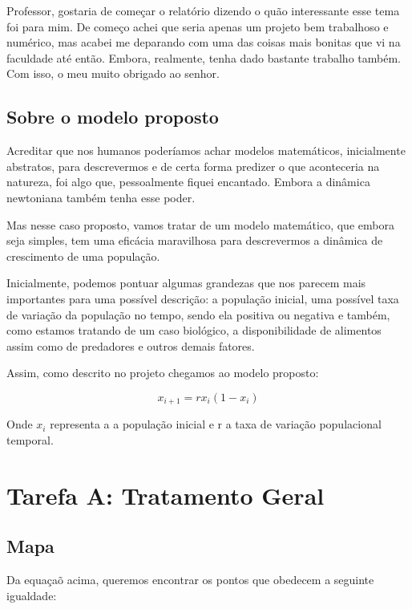 \documentclass[a4paper, 12pt]{article}
\begin{document}
Professor, gostaria de começar o relatório dizendo o quão interessante esse tema foi para mim. De começo achei que seria apenas um projeto bem trabalhoso e numérico, mas acabei me deparando com uma das coisas mais bonitas que vi na faculdade até então. Embora, realmente, tenha dado bastante trabalho também. Com isso, o meu muito obrigado ao senhor.

\subsection{Sobre o modelo proposto}

Acreditar que nos humanos poderíamos achar modelos matemáticos, inicialmente abstratos, para descrevermos e de certa forma predizer o que aconteceria na natureza, foi algo que, pessoalmente fiquei encantado. Embora a dinâmica newtoniana também tenha esse poder.

Mas nesse caso proposto, vamos tratar de um modelo matemático, que embora seja simples, tem uma eficácia maravilhosa para descrevermos a dinâmica de crescimento de uma população.

Inicialmente, podemos pontuar algumas grandezas que nos parecem mais importantes para uma possível descrição: a população inicial, uma possível taxa de variação da população no tempo, sendo ela positiva ou negativa e também, como estamos tratando de um caso biológico, a disponibilidade de alimentos assim como de predadores e outros demais fatores.

\hfill

Assim, como descrito no projeto chegamos ao modelo proposto:

\begin{equation}
    x_{i+1} = rx_{i}(1-x_{i})
\end{equation}

Onde $x_{i}$ representa a a população inicial e r a taxa de variação populacional temporal.



\section{Tarefa A: Tratamento Geral}

\subsection{Mapa}

Da equaçaõ acima, queremos encontrar os pontos que obedecem a seguinte igualdade:
\end{document}
